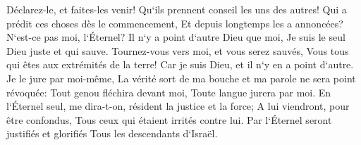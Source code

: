 \verse Déclarez-le, et faites-les venir! Qu`ils prennent conseil les uns des autres! Qui a prédit ces choses dès le commencement, Et depuis longtemps les a annoncées? N`est-ce pas moi, l`Éternel? Il n`y a point d`autre Dieu que moi, Je suis le seul Dieu juste et qui sauve. 
\verse Tournez-vous vers moi, et vous serez sauvés, Vous tous qui êtes aux extrémités de la terre! Car je suis Dieu, et il n`y en a point d`autre. 
\verse Je le jure par moi-même, La vérité sort de ma bouche et ma parole ne sera point révoquée: Tout genou fléchira devant moi, Toute langue jurera par moi. 
\verse En l`Éternel seul, me dira-t-on, résident la justice et la force; A lui viendront, pour être confondus, Tous ceux qui étaient irrités contre lui. 
\verse Par l`Éternel seront justifiés et glorifiés Tous les descendants d`Israël. 

